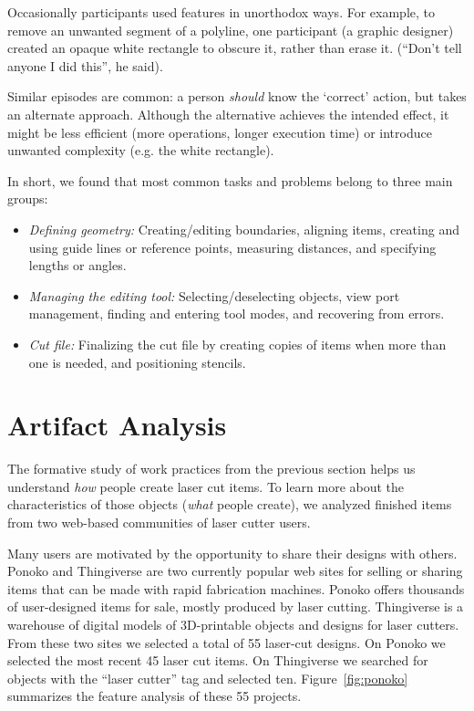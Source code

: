 Occasionally participants used features in unorthodox ways. For
example, to remove an unwanted segment of a polyline, one participant
(a graphic designer) created an opaque white rectangle to obscure it,
rather than erase it. (``Don't tell anyone I did this'', he said).

Similar episodes are common: a person \textit{should} know the
`correct' action, but takes an alternate approach. Although the
alternative achieves the intended effect, it might be less efficient
(more operations, longer execution time) or introduce unwanted
complexity (e.g. the white rectangle).

In short, we found that most common tasks and problems belong to three
main groups:

\begin{itemize}
\item \textit{Defining geometry:} Creating/editing boundaries,
  aligning items, creating and using guide lines or reference points,
  measuring distances, and specifying lengths or angles.
\item \textit{Managing the editing tool:} Selecting/deselecting
  objects, view port management, finding and entering tool modes, and
  recovering from errors.
\item \textit{Cut file:} Finalizing the cut file by creating copies of
  items when more than one is needed, and positioning stencils.
\end{itemize}


\section{Artifact Analysis}
\label{sec:formative-artifact}


The formative study of work practices from the previous section helps
us understand \textit{how} people create laser cut items. To learn
more about the characteristics of those objects (\textit{what} people
create), we analyzed finished items from two web-based communities of
laser cutter users.

Many users are motivated by the opportunity to share their designs
with others. Ponoko and Thingiverse are two currently popular web
sites for selling or sharing items that can be made with rapid
fabrication machines. Ponoko offers thousands of user-designed items
for sale, mostly produced by laser cutting. Thingiverse is a warehouse
of digital models of 3D-printable objects and designs for laser
cutters. From these two sites we selected a total of 55 laser-cut
designs. On Ponoko we selected the most recent 45 laser cut items.  On
Thingiverse we searched for objects with the ``laser cutter'' tag and
selected ten. Figure~\ref{fig:ponoko} summarizes the feature analysis
of these 55 projects.

